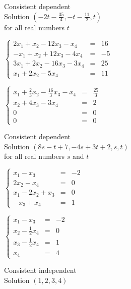 \documentclass{ximera}
\begin{document}
\begin{question}
\begin{problem}
\begin{solution}
Consistent dependent\\
Solution $\left(-2t - \frac{35}{4},-t - \frac{11}{2},t\right)$\\
for all real numbers $t$
\end{solution}
\end{problem}

\begin{problem}
$\left\{ \begin{array}{rcr} 2x_1 + x_2 - 12x_3 -  x_4 & = & 16 \\ 
-x_1 + x_2 + 12x_3 - 4x_4 & = & -5  \\  
3x_1 +  2x_2 - 16x_3 - 3x_4 & = & 25 \\
x_1 +  2x_2 - 5x_4 & = & 11  \end{array} \right.$

\begin{solution}
$\left\{ \begin{array}{rcr} x_1 + \frac{2}{3}x_2 - \frac{16}{3}x_3 -  x_4 & = & \frac{25}{3} \\  
x_2 + 4x_3 - 3x_4 & = & 2  \\  
0 & = & 0 \\
0 & = & 0  \end{array} \right.$

Consistent dependent\\
Solution $(8s - t + 7, -4s + 3t + 2, s, t)$\\
for all real numbers $s$ and $t$
\end{solution}
\end{problem}

\begin{problem}
$\left\{ \begin{array}{rcr} x_1 - x_3 & = & -2 \\ 
2x_2 - x_4 & = & 0  \\  
x_1 -  2x_2 + x_3 & = & 0 \\
-x_3 + x_4 & = & 1  \end{array} \right.$

\begin{solution}
$\left\{ \begin{array}{rcr} x_1 - x_3 & = & -2 \\  
x_2 - \frac{1}{2}x_4 & = & 0  \\  
x_3 - \frac{1}{2} x_4 & = & 1 \\  
x_4 & = & 4  \end{array} \right.$

Consistent independent\\
Solution $(1, 2, 3, 4)$
\end{solution}
\end{problem}


\end{question}
\end{document}
